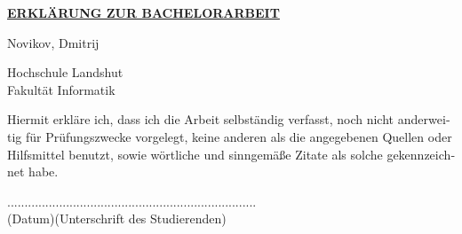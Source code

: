 \begin{otherlanguage}{ngerman}
\thispagestyle{empty}
\vspace{15mm}
\begin{center}
\textbf{\underline{ERKLÄRUNG ZUR BACHELORARBEIT}}
\end{center}
\vspace{25mm}
\begin{center}
\large
\large
Novikov, Dmitrij
\end{center}
\vspace{25mm}

\begin{center}
\huge
Hochschule Landshut \\
Fakultät Informatik 
\end{center}
\vspace{10mm}

\begin{center}
\large
Hiermit erkläre ich, dass ich die Arbeit selbständig 
verfasst, noch nicht anderweitig für Prüfungszwecke 
vorgelegt, keine anderen als die angegebenen Quellen 
oder Hilfsmittel benutzt, sowie wörtliche und sinngemäße 
Zitate als solche gekennzeichnet habe.  \\
\end{center}
\vspace{55mm}

\begin{center}
....................\hspace{40mm}....................................................\\

(Datum)\hspace{47mm}(Unterschrift des Studierenden)
\end{center}
\end{otherlanguage}
